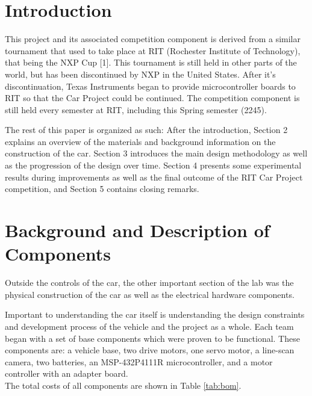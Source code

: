 \documentclass[conference]{IEEEtran}
\begin{document}
\section{Introduction}
    This project and its associated competition component is derived from
    a similar tournament that used to take place at RIT 
    (Rochester Institute of Technology), that being the NXP
    Cup [1]. This tournament is still held in other parts of the world, but has
    been discontinued by NXP in the United States. After it's discontinuation, Texas Instruments began to provide
    microcontroller boards to RIT so that the Car Project could be continued.
    The competition component is still held every semester at RIT, including
    this Spring semester (2245).

    The rest of this paper is organized as such: After the introduction,
    Section 2 explains an overview of the materials and background information
    on the construction of the car. Section 3 introduces the main design
    methodology as well as the progression of the design over time. Section
    4 presents some experimental results during improvements as well as
    the final outcome of the RIT Car Project competition, and Section 5
    contains closing remarks.

\section{Background and Description of Components}
    Outside the controls of the car, the other important section of the lab
    was the physical construction of the car as well as the electrical
    hardware components. 

    Important to understanding the car itself is understanding the design
    constraints and development process of the vehicle and the project as a
    whole. Each team began with a set of base components which were proven to
    be functional. These components are: a vehicle base, two drive motors,
    one servo motor, a line-scan camera, two batteries, an MSP-432P4111R
    microcontroller, and a motor controller with an adapter board. \\

    The total costs of all components are shown in Table \ref{tab:bom}.
\end{document}
